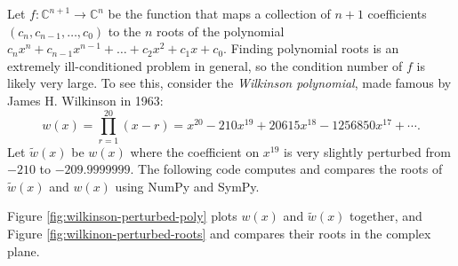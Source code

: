 Let $f:\mathbb{C}^{n+1} \rightarrow \mathbb{C}^n$ be the function that maps a collection of $n+1$ coefficients $(c_n, c_{n-1}, \ldots, c_0)$ to the $n$ roots of the polynomial $c_nx^n+c_{n-1}x^{n-1}+\ldots+c_2x^2+c_1x+c_0$.
Finding polynomial roots is an extremely ill-conditioned problem in general, so the condition number of $f$ is likely very large.
To see this, consider the \emph{Wilkinson polynomial}, made famous by James H. Wilkinson in 1963:
\[
w(x) = \prod_{r=1}^{20}(x-r) = x^{20} - 210x^{19} + 20615x^{18} - 1256850x^{17} + \cdots.
\]
Let $\tilde{w}(x)$ be $w(x)$ where the coefficient on $x^{19}$ is very slightly perturbed from $-210$ to $-209.9999999$.
The following code computes and compares the roots of $\tilde{w}(x)$ and $w(x)$ using NumPy and SymPy.

Figure \ref{fig:wilkinson-perturbed-poly} plots $w(x)$ and $\tilde{w}(x)$ together, and Figure \ref{fig:wilkinon-perturbed-roots} and compares their roots in the complex plane.

